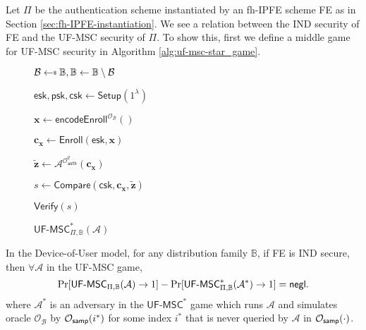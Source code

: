 Let $\Pi$ be the authentication scheme instantiated by an fh-IPFE scheme \textsf{FE} as in Section \ref{sec:fh-IPFE-instantiation}.
We see a relation between the IND security of \textsf{FE} and the UF-MSC security of $\Pi$.
To show this, first we define a middle game for UF-MSC security in Algorithm \ref{alg:uf-msc-star_game}.

\begin{figure}[h]
\centering
	
	\begin{minipage}[t]{0.5\linewidth}
	\centering
	\begin{algorithm}[H]
	\caption{$\textsf{UF-MSC}^*_{\Pi, \mathbb{B}}(\mathcal{A})$}
	\label{alg:uf-msc-star_game}
	\begin{algorithmic}[1]
		\State $\mathcal{B} \getsdollar \mathbb{B}, \mathbb{B} \gets \mathbb{B} \setminus \mathcal{B}$

		\State $\textsf{esk}, \textsf{psk}, \textsf{csk} \gets \textsf{Setup}(1^\lambda)$

		\State $\mathbf{x} \gets \textsf{encodeEnroll}^{\mathcal{O}_{\mathcal{B}}}()$

		\State $\mathbf{c_x} \gets \textsf{Enroll}(\textsf{esk}, \mathbf{x})$

		\State ${\mathbf{\tilde{z}}} \gets \mathcal{A}^{\mathcal{O}_\textsf{auth}^q } ( \mathbf{c_x} )$

		\State $s \gets \textsf{Compare}( \textsf{csk}, \mathbf{c_x}, \mathbf{\tilde{z}} )$

		\State \Return $\textsf{Verify}(s)$
	\end{algorithmic}
	\end{algorithm}
	\end{minipage}
	
\label{fig:uf-msc-star_game}
\end{figure}


\begin{theorem}
\label{thm:ind-uf-msc1}

	In the Device-of-User model, for any distribution family $\mathbb{B}$, if \textsf{FE} is IND secure, then $\forall \mathcal{A}$ in the \textsf{UF-MSC} game,
	\[
		\Pr[\textsf{UF-MSC}_{\Pi, \mathbb{B}}(\mathcal{A}) \to 1] - \Pr[\textsf{UF-MSC}^*_{\Pi, \mathbb{B}}(\mathcal{A}^*) \to 1] = \mathsf{negl}.
	\]
	where $\mathcal{A}^*$ is an adversary in the $\textsf{UF-MSC}^*$ game which runs $\mathcal{A}$ and simulates oracle $\mathcal{O}_{\mathcal{B}}$ by $\mathcal{O}_{\sf samp}(i^*)$ for some index $i^*$ that is never queried by $\mathcal{A}$ in $\mathcal{O}_{\sf samp}(\cdot)$.

\end{theorem}


